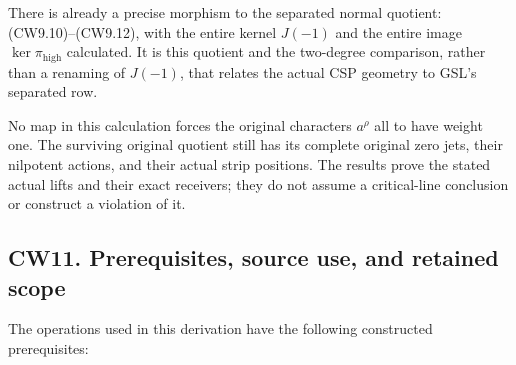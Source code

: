 There is already a precise morphism to the separated normal quotient:
(CW9.10)--(CW9.12), with the entire kernel \(J(-1)\) and the entire
image \(\ker\pi_{\mathrm{high}}\) calculated. It is this quotient and
the two-degree comparison, rather than a renaming of \(J(-1)\), that
relates the actual CSP geometry to GSL's separated row.

No map in this calculation forces the original characters \(a^\rho\) all
to have weight one. The surviving original quotient still has its
complete original zero jets, their nilpotent actions, and their actual
strip positions. The results prove the stated actual lifts and their
exact receivers; they do not assume a critical-line conclusion or
construct a violation of it.

\subsection{CW11. Prerequisites, source use, and retained
scope}\label{cw11.-prerequisites-source-use-and-retained-scope}

The operations used in this derivation have the following constructed
prerequisites:

